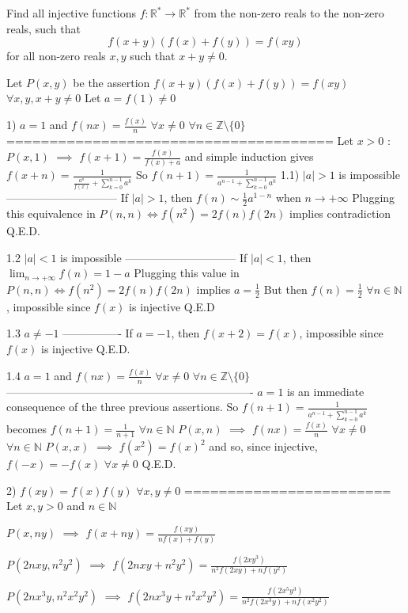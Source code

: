 \begin{solution}
	\begin{tcolorbox}Find all injective functions $f: \mathbb{R}^* \to \mathbb{R}^* $ from the non-zero reals to the non-zero reals, such that \[f(x+y) \left(f(x) + f(y)\right) = f(xy)\] for all non-zero reals $x, y$ such that $x+y \neq 0$.\end{tcolorbox}
Let $P(x,y)$ be the assertion $f(x+y)(f(x)+f(y))=f(xy)$ $\forall x,y,x+y\ne 0$
Let $a=f(1)\ne 0$

1) $a=1$ and $f(nx)=\frac {f(x)}n$ $\forall x\ne 0$ $\forall n\in\mathbb Z\setminus\{0\}$
======================================
Let $x>0$ : 
$P(x,1)$ $\implies$ $f(x+1)=\frac{f(x)}{f(x)+a}$ and simple induction gives $f(x+n)=\frac 1{\frac{a^n}{f(x)}+\sum_{k=0}^{n-1}a^k}$
So $f(n+1)=\frac 1{a^{n-1}+\sum_{k=0}^{n-1}a^k}$
1.1) $|a|>1$ is impossible
------------------------------
If $|a|>1$, then $f(n)\sim \frac 12a^{1-n}$ when $n\to+\infty$
Plugging this equivalence in $P(n,n)\iff f(n^2)=2f(n)f(2n)$ implies contradiction
Q.E.D.

1.2 $|a|<1$ is impossible
------------------------------
If $|a|<1$, then $\lim_{n\to+\infty}f(n)=1-a$
Plugging this value in $P(n,n)\iff f(n^2)=2f(n)f(2n)$ implies $a=\frac 12$
But then $f(n)=\frac 12$ $\forall n\in\mathbb N$, impossible since $f(x)$ is injective
Q.E.D

1.3 $a\ne -1$
----------------
If $a=-1$, then $f(x+2)=f(x)$, impossible since $f(x)$ is injective
Q.E.D.

1.4 $a=1$ and $f(nx)=\frac {f(x)}n$ $\forall x\ne 0$ $\forall n\in\mathbb Z\setminus\{0\}$
-------------------------------------------------------------------
$a=1$ is an immediate consequence of the three previous assertions.
So $f(n+1)=\frac 1{a^{n-1}+\sum_{k=0}^{n-1}a^k}$ becomes $f(n+1)=\frac 1{n+1}$ $\forall n\in\mathbb N$
$P(x,n)$ $\implies$  $f(nx)=\frac {f(x)}n$ $\forall x\ne 0$ $\forall n\in\mathbb N$
$P(x,x)$ $\implies$ $f(x^2)=f(x)^2$ and so, since injective, $f(-x)=-f(x)$ $\forall x\ne 0$
Q.E.D.


2) $f(xy)=f(x)f(y)$ $\forall x,y\ne 0$
========================
Let $x,y>0$ and $n\in\mathbb N$

$P(x,ny)$ $\implies$ $f(x+ny)=\frac{f(xy)}{nf(x)+f(y)}$

$P(2nxy,n^2y^2)$ $\implies$ $f(2nxy+n^2y^2)=\frac{f(2xy^3)}{n^2f(2xy)+nf(y^2)}$

$P(2nx^3y,n^2x^2y^2)$ $\implies$ $f(2nx^3y+n^2x^2y^2)=\frac{f(2x^5y^3)}{n^2f(2x^3y)+nf(x^2y^2)}$


\end{solution}
